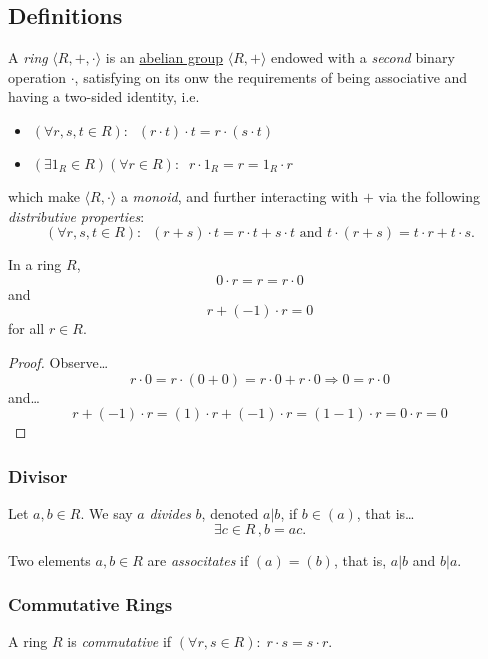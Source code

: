 \subsection{Definitions}\label{ringdefinition}
A \emph{ring} $\langle R, +, \cdot \rangle$ is an \hyperref[abeliangroupdefinition]{abelian group} $\langle R,+ \rangle$ endowed with a \emph{second}
binary operation $\cdot$, satisfying on its onw the requirements of being associative and having a two-sided identity, i.e.
\begin{itemize}
  \item $(\forall r,s,t \in R): \; \; (r \cdot t) \cdot t = r \cdot (s \cdot t)$
  \item $(\exists 1_R \in R) (\forall r \in R): \; \; r \cdot 1_R = r = 1_R \cdot r$
\end{itemize}
which make $\langle R, \cdot \rangle$ a \emph{monoid}, and further interacting with $+$ via the following \emph{distributive properties}:
$$(\forall r,s,t \in R): \; \; (r+s)\cdot t = r \cdot t + s \cdot t \textrm{ and } t \cdot (r + s) = t \cdot r + t \cdot s.$$

\begin{lemma}
In a ring $R$,
$$0 \cdot r = r = r \cdot 0$$
and
$$r + (-1) \cdot r = 0$$
for all $r \in R.$
\end{lemma}

\begin{proof}
Observe\dots
$$r \cdot 0 = r \cdot (0 + 0) = r \cdot 0 + r \cdot 0 \Rightarrow 0 = r \cdot 0$$
and\dots
$$r + (-1) \cdot r = (1) \cdot r + (-1) \cdot r = (1 - 1) \cdot r = 0 \cdot r = 0$$
\end{proof}

\subsubsection{Divisor}\label{divisor}
Let $a,b \in R$. We say $a$ \emph{divides} $b$, denoted $a | b$, if $b \in (a)$, that is\dots
$$\exists c \in R \,, b = ac.$$

\label{associates}
Two elements $a,b \in R$ are \emph{associtates} if $(a) = (b)$, that is, $a | b$ and $b | a$.

\subsubsection{Commutative Rings}\label{commutativeringdefinition}
A ring $R$ is \emph{commutative} if $(\forall r,s \in R): \; r \cdot s = s \cdot r$.

